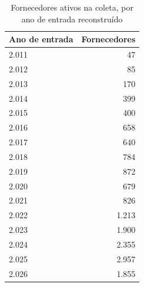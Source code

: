 \begin{table}[ht]
\centering
\caption{Fornecedores ativos na coleta, por ano de entrada reconstruído}
\label{tab:entradas_por_ano}
\begin{tabular}{lr}
\hline
\textbf{Ano de entrada} & \textbf{Fornecedores} \\
\hline
2.011 & 47 \\
2.012 & 85 \\
2.013 & 170 \\
2.014 & 399 \\
2.015 & 400 \\
2.016 & 658 \\
2.017 & 640 \\
2.018 & 784 \\
2.019 & 872 \\
2.020 & 679 \\
2.021 & 826 \\
2.022 & 1.213 \\
2.023 & 1.900 \\
2.024 & 2.355 \\
2.025 & 2.957 \\
2.026 & 1.855 \\
\hline
\end{tabular}
\end{table}
